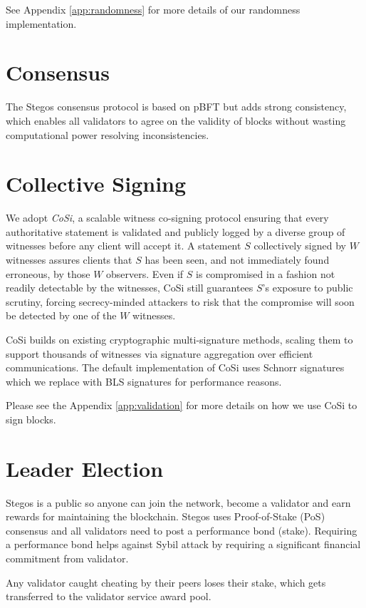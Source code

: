 \documentclass[8pt,fleqn,openany]{book}
\begin{document}
See Appendix \ref{app:randomness} for more details of our randomness implementation. 

\section{Consensus}

The Stegos consensus protocol is based on pBFT\cite{c9} but adds strong consistency, which enables all validators to agree on the validity of blocks without wasting computational power resolving inconsistencies. 

\section{Collective Signing}
We adopt \textit{CoSi}\cite{c10,c11}, a scalable witness co-signing protocol ensuring that every authoritative statement is validated and publicly logged by a diverse group of witnesses before any client will accept it. A statement $S$ collectively signed by $W$ witnesses assures clients that $S$ has been seen, and not immediately found erroneous, by those $W$ observers. Even if $S$ is compromised in a fashion not readily detectable by the witnesses, CoSi still guarantees $S$’s exposure to public scrutiny, forcing secrecy-minded attackers to risk that the compromise will soon be detected by one of the $W$ witnesses. 

CoSi builds on existing cryptographic multi-signature methods, scaling them to support thousands of witnesses via signature aggregation over efficient communications. The default implementation of CoSi uses Schnorr signatures which we replace with BLS signatures for performance reasons.

Please see the Appendix \ref{app:validation} for more details on how we use CoSi to sign blocks.

\section{Leader Election}
Stegos is a public so anyone can join the network, become a validator and earn rewards for maintaining the blockchain. Stegos uses Proof-of-Stake (PoS) consensus and all validators need to post a performance bond (stake). Requiring a performance bond helps against Sybil attack by requiring a significant financial commitment from validator.

Any validator caught cheating by their peers loses their stake, which gets transferred to the validator service award pool. 
\end{document}
